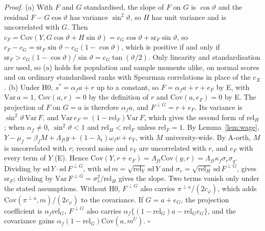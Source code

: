 \documentclass[11pt]{article}
\newcommand{\qedsq}{\hfill$\square$}
\begin{document}
\emph{Proof.} (a) With $F$ and $G$ standardised, the slope of $F$ on $G$ is $\cos\vartheta$ and the residual
$F-G\cos\vartheta$ has variance $\sin^2\vartheta$, so $H$ has unit variance and is uncorrelated with $G$. Then
$c_F=\mathrm{Cov}(Y,G\cos\vartheta+H\sin\vartheta)=c_G\cos\vartheta+\mathrm{sr}_F\sin\vartheta$, so
$c_F-c_G=\mathrm{sr}_F\sin\vartheta-c_G(1-\cos\vartheta)$, which is positive if and only if
$\mathrm{sr}_F>c_G(1-\cos\vartheta)/\sin\vartheta=c_G\tan(\vartheta/2)$. Only linearity and standardisation are used, so
(a) holds for population and sample moments alike, on normal scores and on ordinary standardised ranks with Spearman
correlations in place of the $c_X$.
(b) Under H0, $s^*=\alpha_fa+r$ up to a constant, so $F=\alpha_fa+r+e_F$ by E, with $\mathrm{Var}\,a=1$,
$\mathrm{Cov}(a,r)=0$ by the definition of $r$ and $\mathrm{Cov}(a,e_F)=0$ by E. The projection of $F$ on $G=a$ is
therefore $\alpha_fa$, and $F^{\perp G}=r+e_F$. Its variance is $\sin^2\vartheta\,\mathrm{Var}\,F$, and
$\mathrm{Var}\,e_F=(1-\mathrm{rel}_F)\mathrm{Var}\,F$, which gives the second form of $\mathrm{rel}_H$; when
$\alpha_f\neq0$, $\sin^2\vartheta<1$ and $\mathrm{rel}_H<\mathrm{rel}_F$ unless $\mathrm{rel}_F=1$. By
Lemma~\ref{lem:wage}, $Y-\mu_f=\beta_fM+\Lambda_{ft}y+(1-\lambda_t)\omega_f\nu+e_Y$, with $M$ university-wide.
By A-orth, $M$ is uncorrelated with $r$; record noise and $e_Y$ are uncorrelated
with $r$, and $e_F$ with every term of $Y$ (E). Hence $\mathrm{Cov}(Y,r+e_F)=\Lambda_{ft}\mathrm{Cov}(y,r)=
\Lambda_{ft}\kappa_f\sigma_r\sigma_y$. Dividing by $\mathrm{sd}\,Y\cdot\mathrm{sd}\,F^{\perp G}$, with
$\mathrm{sd}\,m=\sqrt{\mathrm{rel}_Y}\,\mathrm{sd}\,Y$ and $\sigma_r=\sqrt{\mathrm{rel}_H}\,\mathrm{sd}\,F^{\perp G}$, gives
$\mathrm{sr}_F$; dividing by $\mathrm{Var}\,F^{\perp G}=\sigma_r^2/\mathrm{rel}_H$ gives the slope. Two terms vanish only
under the stated assumptions. Without H0, $F^{\perp G}$ also carries $\pi^{\perp a}/(2c_\varphi)$, which adds
$\mathrm{Cov}(\pi^{\perp a},m)/(2c_\varphi)$ to the covariance. If $G=a+e_G$, the projection coefficient is
$\alpha_f\mathrm{rel}_G$, $F^{\perp G}$ also carries $\alpha_f\{(1-\mathrm{rel}_G)a-\mathrm{rel}_Ge_G\}$, and the
covariance gains $\alpha_f(1-\mathrm{rel}_G)\mathrm{Cov}(a,m^U)$. \qedsq
\end{document}
